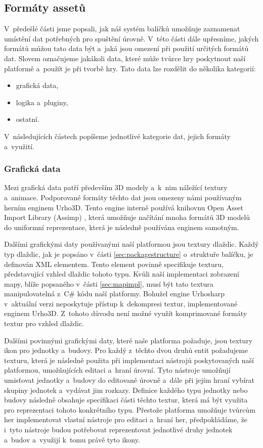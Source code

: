 \subsection{Formáty assetů}
V~předešlé části jsme popsali, jak náš systém balíčků umožňuje zaznamenat umístění dat potřebných pro spuštění úrovně. V~této části dále upřesníme, jakých formátů můžou tato data být a~jaká jsou omezení při použití určitých formátů dat. Slovem \textit{ } označujeme jakákoli data, které může tvůrce hry poskytnout naší platformě a~použít je při tvorbě hry. Tato data lze rozdělit do několika kategorií:
\begin{itemize}
	\item grafická data,
	\item logika a~pluginy,
	\item ostatní.
\end{itemize}

V~následujících částech popíšeme jednotlivé kategorie dat, jejich formáty a~využití.

\subsubsection{Grafická data}
Mezi grafická data patří především 3D modely a~k~nim náležící textury a~animace. Podporované formáty těchto dat jsou omezeny námi používaným herním enginem Urho3D. Tento engine interně používá knihovnu Open Asset Import Library (Assimp) \citep{site:assimp}, která umožňuje načítání mnoha formátů 3D modelů do uniformní reprezentace, která je následně používána enginem samotným.

Dalšími grafickými daty používanými naší platformou jsou textury dlaždic. Každý typ dlaždic, jak je popsáno v~části \ref{sec:packagestructure} o~struktuře balíčku, je definován XML elementem. Tento element povinně specifikuje texturu, představující vzhled dlaždic tohoto typu. Kvůli naší implementaci zobrazení mapy, blíže popsaného v~části \ref{sec:mapimpl}, musí být tato textura manipulovatelná z~C\# kódu naší platformy. Bohužel engine Urhosharp v~aktuální verzi neposkytuje přístup k~dekompresi textur, implementované enginem Urho3D. Z~tohoto důvodu není možné využít komprimované formáty textur pro vzhled dlaždic.

Dalšími povinnými grafickými daty, které naše platforma požaduje, jsou textury ikon pro jednotky a~budovy. Pro každý z~těchto dvou druhů entit požadujeme texturu, která je následně použita při implementaci nástrojů  poskytovaných naší platformou, umožňujících editaci a~hraní úrovní. Tyto nástroje umožňují umisťovat jednotky a~budovy do editované úrovně a~dále při jejím hraní vybírat skupiny jednotek a~vydávat jim rozkazy. Definice každého typu jednotky nebo budovy následně obsahuje specifikaci části těchto textur, která má být využita pro reprezentaci tohoto konkrétního typu. Přestože platforma umožňuje tvůrcům her implementovat vlastní nástroje pro editaci a~hraní her, předpokládáme, že i~tyto nástroje budou potřebovat reprezentovat jednotlivé druhy jednotek a~budov a~využijí k~tomu právě tyto ikony.


